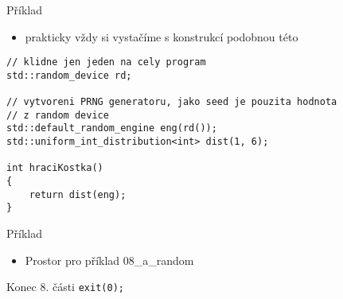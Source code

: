 \documentclass{beamer}
\begin{document}
\begin{xframe}{Příklad}
	\begin{itemize}
		\item prakticky vždy si vystačíme s konstrukcí podobnou této
	\end{itemize}
	
\begin{lstlisting}[basicstyle=\fontsize{8}{9}\selectfont\ttfamily]
// klidne jen jeden na cely program
std::random_device rd;

// vytvoreni PRNG generatoru, jako seed je pouzita hodnota
// z random device
std::default_random_engine eng(rd());
std::uniform_int_distribution<int> dist(1, 6);

int hraciKostka()
{
    return dist(eng);
}
\end{lstlisting}
	
\end{xframe}


\begin{xframe}{Příklad}
	\begin{itemize}
		\item Prostor pro příklad 08\_a\_random
	\end{itemize}
\end{xframe}




\begin{xframe}{Konec 8. části}
\texttt{exit(0);}
\end{xframe}
\end{document}
